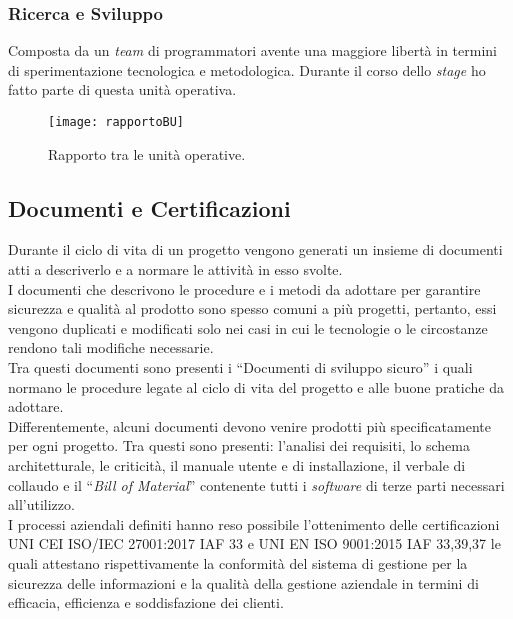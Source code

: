 \subsubsection*{Ricerca e Sviluppo}
Composta da un \emph{team} di programmatori avente una maggiore libertà in termini di sperimentazione tecnologica e metodologica. Durante il corso dello \emph{stage} ho fatto parte di questa unità operativa.\\
\begin{figure}[htbp] 
    \centering 
    \texttt{[image: rapportoBU]}
    \caption{Rapporto tra le unità operative.} 
    \label{fig:rapportoBU}
\end{figure}
\newpage \subsection{Documenti e Certificazioni}
Durante il ciclo di vita di un progetto vengono generati un insieme di documenti atti a descriverlo e a normare le attività in esso svolte.\\
I documenti che descrivono le procedure e i metodi da adottare per garantire sicurezza e qualità al prodotto sono spesso comuni a più progetti, pertanto, essi vengono duplicati e modificati solo nei casi in cui le tecnologie o le circostanze rendono tali modifiche necessarie.\\
Tra questi documenti sono presenti i “Documenti di sviluppo sicuro” i quali normano le procedure legate al ciclo di vita del progetto e alle buone pratiche da adottare.\\ 
Differentemente, alcuni documenti devono venire prodotti più specificatamente per ogni progetto. Tra questi sono presenti: l'analisi dei requisiti, lo schema architetturale, le criticità, il manuale utente e di installazione, il verbale di collaudo e il “\emph{Bill of Material}” contenente tutti i \emph{software} di terze parti necessari all'utilizzo.\\
I processi aziendali definiti hanno reso possibile l'ottenimento delle certificazioni UNI CEI ISO/IEC 27001:2017 IAF 33 e UNI EN ISO 9001:2015 IAF 33,39,37 le quali attestano rispettivamente la conformità del sistema di gestione per la sicurezza delle informazioni e la qualità della gestione aziendale in termini di efficacia, efficienza e soddisfazione dei clienti.\\


